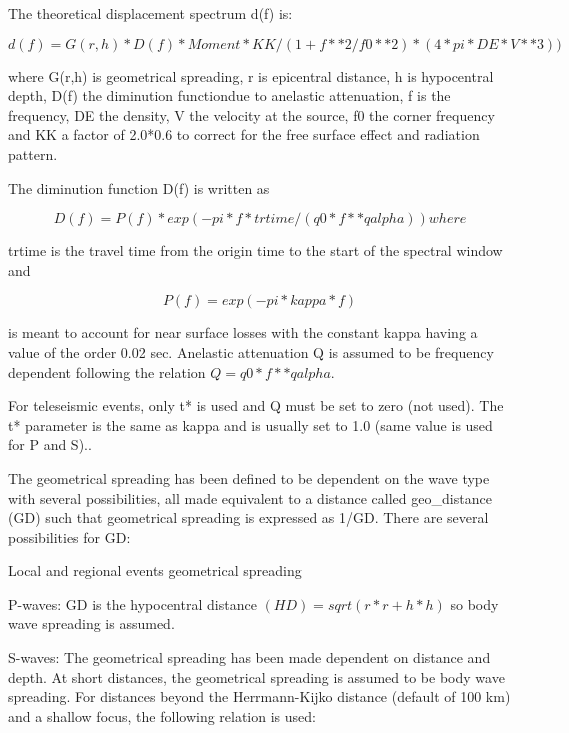 The theoretical displacement spectrum d(f)\citep{brune1970} is: 

\begin{displaymath}
d(f) = G(r,h) * D(f) * Moment*KK /(1+f**2/f0**2)* (4 * pi * DE * V**3)) 
\end{displaymath}

where G(r,h) is geometrical spreading, r is epicentral distance, h is hypocentral depth, D(f) the diminution functiondue to anelastic attenuation, f is the frequency, DE the density, V the velocity at the source, f0 the corner frequency and KK a factor of 2.0*0.6 to correct for the free surface effect and radiation pattern. 

The diminution function D(f) is written as 

\begin{displaymath}
D(f) = P(f) * exp (-pi*f*trtime/(q0*f**qalpha)) where 
\end{displaymath}

trtime is the travel time from the origin time to the start of the spectral window and  

\begin{displaymath}
P(f) = exp (-pi*kappa*f) 
\end{displaymath}

is meant to account for near surface losses \citep{singh1982} with 
the constant kappa having a value of the order 0.02 sec. Anelastic 
attenuation Q is assumed to be frequency dependent following the 
relation $Q = q0* f**qalpha$. 

For teleseismic events, only t* is used and Q must be set to zero (not used).  The t* parameter is the same as kappa and is usually set to 1.0 (same value is used for P and S).. 

The geometrical spreading has been defined to be dependent on the wave type with several possibilities, all made equivalent to a distance called geo\_distance (GD) such that geometrical spreading is expressed as 1/GD. There are several possibilities for GD: 

Local and regional events geometrical spreading 

P-waves:\newline
GD is the hypocentral distance $(HD) = sqrt (r*r +h*h)$ so body wave spreading is assumed. 

S-waves:\newline
The geometrical spreading has been made dependent on distance and depth. At short distances, the geometrical spreading is assumed to be body wave spreading. For distances beyond the Herrmann-Kijko distance (default of 100 km) and a shallow focus, the following  relation is used: 

